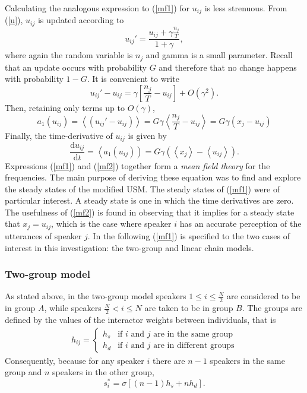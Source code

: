 \documentclass[12pt]{article}
\begin{document}
Calculating the analogous expression to (\ref{mf1}) for $u_{ij}$ is less strenuous. From (\ref{u}), $u_{ij}$ is updated according to
\begin{equation}
u_{ij}' = \frac{u_{ij} + \gamma \frac{n_j}{T}}{1+\gamma},
\end{equation}
where again the random variable is $n_j$ and gamma is a small parameter. Recall that an update occurs with probability $G$ and therefore that no change happens with probability $1-G$. It is convenient to write
\begin{equation}
u_{ij}' - u_{ij} = \gamma \left[ \frac{n_j}{T} - u_{ij}\right] + O\left(\gamma^2 \right).
\end{equation}
Then, retaining only terms up to $O(\gamma)$, 
\begin{equation}
a_1(u_{ij}) = \left\langle \left( u_{ij}' - u_{ij} \right) \right\rangle = G \gamma \left\langle \frac{n_j}{T} - u_{ij} \right\rangle = G \gamma(x_j - u_{ij}) 
\end{equation}
Finally, the time-derivative of $u_{ij}$ is given by
\begin{equation}\label{mf2}
\frac{\mathrm d u_{ij}}{\mathrm d t} = \left\langle a_1 (u_{ij}) \right) = G \gamma ( \left\langle x_j \right\rangle - \left\langle u_{ij} \right\rangle).
\end{equation}
Expressions (\ref{mf1}) and (\ref{mf2}) together form a \emph{mean field theory} for the frequencies. The main purpose of deriving these equation was to find and explore the steady states of the modified USM. The steady states of (\ref{mf1}) were of particular interest. A steady state is one in which the time derivatives are zero. The usefulness of (\ref{mf2}) is found in observing that it implies for a steady state that $x_j = u_{ij}$, which is the case where speaker $i$ has an accurate perception of the utterances of speaker $j$. In the following (\ref{mf1}) is specified to the two cases of interest in this investigation: the two-group and linear chain models.

\subsubsection{Two-group model}
As stated above, in the two-group model speakers $1\leq i \leq \frac{N}{2}$ are considered to be in group $A$, while speakers $\frac{N}{2}<i \leq N$ are taken to be in group $B$. The groups are defined by the values of the interactor weights between individuals, that is
\begin{align}
h_{ij} = \begin{cases}
h_s & \text{if $i$ and $j$ are in the same group} \\
h_d & \text{if $i$ and $j$ are in different groups}
\end{cases}
\end{align}
Consequently, because for any speaker $i$ there are $n-1$ speakers in the same group and $n$ speakers in the other group,
\begin{equation}
s_i^* = \sigma \left[ (n-1)h_s + nh_d \right].
\end{equation}
\end{document}
